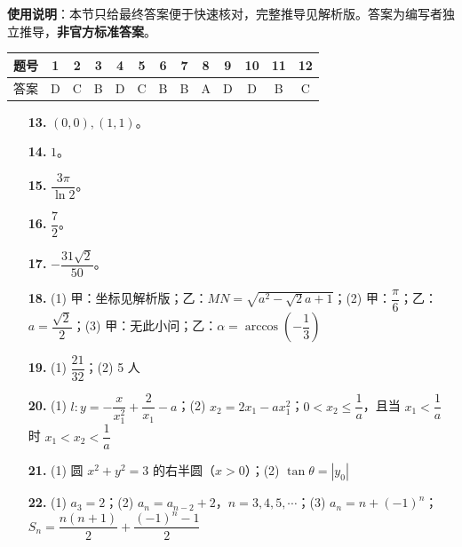 
\begin{gknotice}
\textbf{使用说明}：本节只给最终答案便于快速核对，完整推导见解析版。答案为编写者独立推导，\textbf{非官方标准答案}。
\end{gknotice}

\begin{center}\begin{tabular}{ccccccccccccc}
\toprule
题号 & 1 & 2 & 3 & 4 & 5 & 6 & 7 & 8 & 9 & 10 & 11 & 12 \\
\midrule
答案 & D & C & B & D & C & B & B & A & D & D & B & C \\
\bottomrule
\end{tabular}\end{center}

\begin{itemize}[leftmargin=2.6em]
  \item[\textbf{13.}] $(0,0),(1,1)$。
  \item[\textbf{14.}] $1$。
  \item[\textbf{15.}] $\dfrac{3\pi}{\ln2}$。
  \item[\textbf{16.}] $\dfrac72$。
\end{itemize}

\begin{itemize}[leftmargin=2.6em]
  \item[\textbf{17.}] $-\dfrac{31\sqrt2}{50}$。
  \item[\textbf{18.}] (1) 甲：坐标见解析版；乙：$MN=\sqrt{a^2-\sqrt2a+1}$；(2) 甲：$\dfrac\pi6$；乙：$a=\dfrac{\sqrt2}{2}$；(3) 甲：无此小问；乙：$\alpha=\arccos\left(-\dfrac13\right)$
  \item[\textbf{19.}] (1) $\dfrac{21}{32}$；(2) 5 人
  \item[\textbf{20.}] (1) $l:y=-\dfrac{x}{x_1^2}+\dfrac2{x_1}-a$；(2) $x_2=2x_1-ax_1^2$；$0<x_2\leqslant\dfrac1a$，且当 $x_1<\dfrac1a$ 时 $x_1<x_2<\dfrac1a$
  \item[\textbf{21.}] (1) 圆 $x^2+y^2=3$ 的右半圆（$x>0$）；(2) $\tan\theta=|y_0|$
  \item[\textbf{22.}] (1) $a_3=2$；(2) $a_n=a_{n-2}+2$，$n=3,4,5,\cdots$；(3) $a_n=n+(-1)^n$；$S_n=\dfrac{n(n+1)}2+\dfrac{(-1)^n-1}{2}$
\end{itemize}
